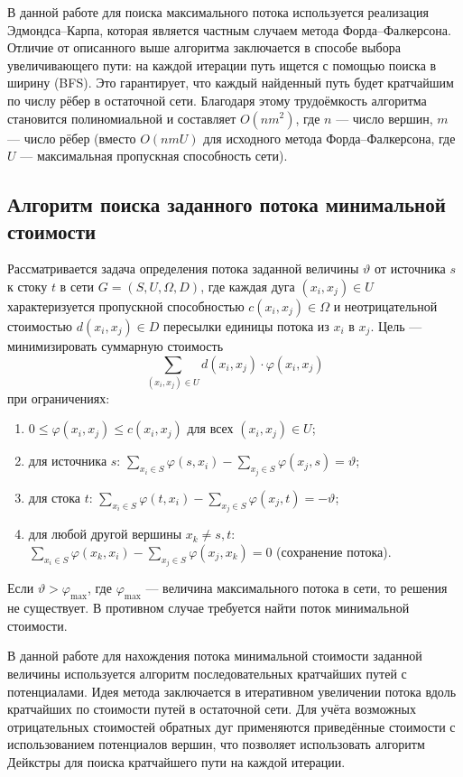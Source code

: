 В данной работе для поиска максимального потока используется реализация \\ Эдмондса–Карпа, которая является частным случаем метода Форда–Фалкерсона. Отличие от описанного выше алгоритма заключается в способе выбора увеличивающего пути: на каждой итерации путь ищется с помощью поиска в ширину (BFS). Это гарантирует, что каждый найденный путь будет кратчайшим по числу рёбер в остаточной сети. Благодаря этому трудоёмкость алгоритма становится полиномиальной и составляет $O(nm^2)$, где $n$ — число вершин, $m$ — число рёбер (вместо $O(nmU)$ для исходного метода Форда–Фалкерсона, где $U$ — максимальная пропускная способность сети).

\subsection{Алгоритм поиска заданного потока минимальной стоимости}

Рассматривается задача определения потока заданной величины $\vartheta$ от источника $s$ к стоку $t$ в сети $G = (S, U, \Omega, D)$, где каждая дуга $(x_i, x_j) \in U$ характеризуется пропускной способностью $c(x_i, x_j) \in \Omega$ и неотрицательной стоимостью $d(x_i, x_j) \in D$ пересылки единицы потока из $x_i$ в $x_j$. Цель — минимизировать суммарную стоимость
\[
\sum_{(x_i, x_j) \in U} d(x_i, x_j) \cdot \varphi(x_i, x_j)
\]
при ограничениях:
\begin{enumerate}
	\item $0 \leq \varphi(x_i, x_j) \leq c(x_i, x_j)$ для всех $(x_i, x_j) \in U$;
	\item для источника $s$: $\displaystyle \sum_{x_i \in S} \varphi(s, x_i) - \sum_{x_j \in S} \varphi(x_j, s) = \vartheta$;
	\item для стока $t$: $\displaystyle \sum_{x_i \in S} \varphi(t, x_i) - \sum_{x_j \in S} \varphi(x_j, t) = -\vartheta$;
	\item для любой другой вершины $x_k \neq s, t$: $\displaystyle \sum_{x_i \in S} \varphi(x_k, x_i) - \sum_{x_j \in S} \varphi(x_j, x_k) = 0$ (сохранение потока).
\end{enumerate}

Если $\vartheta > \varphi_{\max}$, где $\varphi_{\max}$ — величина максимального потока в сети, то решения не существует. В противном случае требуется найти поток минимальной стоимости.

В данной работе для нахождения потока минимальной стоимости заданной величины используется алгоритм последовательных кратчайших путей с потенциалами. Идея метода заключается в итеративном увеличении потока вдоль кратчайших по стоимости путей в остаточной сети. Для учёта возможных отрицательных стоимостей обратных дуг применяются приведённые стоимости с использованием потенциалов вершин, что позволяет использовать алгоритм Дейкстры для поиска кратчайшего пути на каждой итерации.

